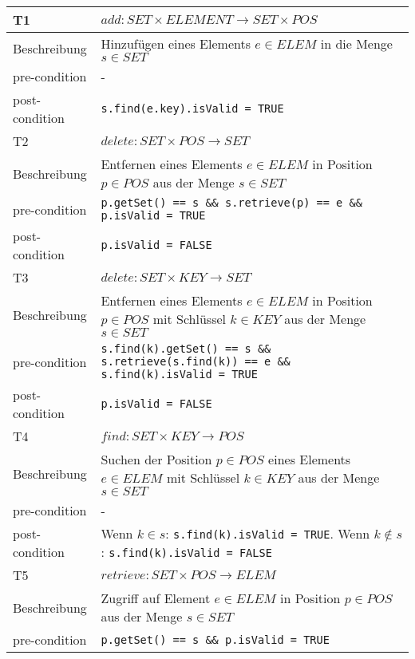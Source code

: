 \documentclass[11pt]{scrartcl}
\begin{document}
\begin{table}
\begin{tabular}[ht]{|l|p{12cm}|}
\hline
T1             & \(add : SET \times ELEMENT \to SET \times POS\) \\ \hline
Beschreibung  & Hinzufügen eines Elements \(e \in ELEM\) in die Menge \(s \in SET\)           \\ \hline
pre-condition  & -           \\ \hline
post-condition & \texttt{s.find(e.key).isValid = TRUE}           \\ \hline
\hline
T2             & \(delete : SET \times POS \to SET\) \\ \hline
Beschreibung  & Entfernen eines Elements \(e \in ELEM\) in Position \(p \in POS\) aus der Menge \(s \in SET\)           \\ \hline
pre-condition  & \texttt{p.getSet() == s \&\& s.retrieve(p) == e \&\& p.isValid = TRUE}            \\ \hline
post-condition & \texttt{p.isValid = FALSE}           \\ \hline
\hline
T3             & \(delete : SET \times KEY \to SET\) \\ \hline
Beschreibung  & Entfernen eines Elements \(e \in ELEM\) in Position \(p \in POS\) mit Schlüssel \(k \in KEY\) aus der Menge \(s \in SET\)           \\ \hline
pre-condition  & \texttt{s.find(k).getSet() == s \&\& s.retrieve(s.find(k)) == e \&\& s.find(k).isValid = TRUE}            \\ \hline
post-condition & \texttt{p.isValid = FALSE}           \\ \hline
\hline
T4             & \(find : SET \times KEY \to POS\) \\ \hline
Beschreibung  & Suchen der Position \(p \in POS\) eines Elements \(e \in ELEM\) mit Schlüssel \(k \in KEY\) aus der Menge \(s \in SET\)           \\ \hline
pre-condition  & -           \\ \hline
post-condition & Wenn \(k \in s\): \texttt{s.find(k).isValid = TRUE}. Wenn \(k \notin s\): \texttt{s.find(k).isValid = FALSE}           \\ \hline
\hline
T5             & \(retrieve : SET \times POS \to ELEM\) \\ \hline
Beschreibung  & Zugriff auf Element \(e \in ELEM\) in Position \(p \in POS\) aus der Menge \(s \in SET\)           \\ \hline
pre-condition  & \texttt{p.getSet() == s \&\& p.isValid = TRUE}           \\ \hline

\end{tabular}
\end{table}
\end{document}
